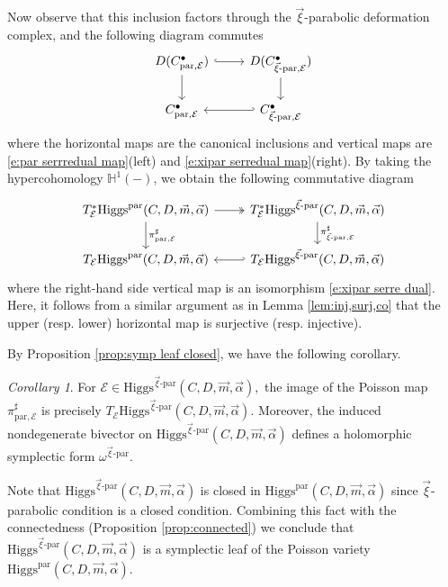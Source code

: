 \documentclass[11pt]{amsart}
\theoremstyle{plain}
\theoremstyle{definition}
\theoremstyle{remark}
\newtheorem{corollary}[theorem]{Corollary}
\newcommand{\Higgs}{\mathrm{Higgs}}
\def\a{\alpha}
\def\vxi{\vec{\xi}}
\def\vm{\vec{m}}
\def\va{\vec{\a}}
\begin{document}
Now observe that this inclusion factors through the $\vxi$-parabolic deformation complex, and the following diagram commutes
\[
\begin{tikzcd}
    D(C_{\text{par},\mathcal E}^\bullet) \arrow[r,hook] \arrow[d] & D(C_{\vxi\text{-par},\mathcal E}^\bullet) \arrow[d] \\
    C_{\text{par},\mathcal E}^\bullet& C_{\vxi\text{-par},\mathcal E}^\bullet \arrow[l, hook']
\end{tikzcd}
\]
where the horizontal maps are the canonical inclusions and vertical maps are \eqref{e:par serrredual map}(left) and \eqref{e:xipar serredual map}(right). By taking the hypercohomology $\mathbb{H}^1(-)$, we obtain the following commutative diagram 
\[
\begin{tikzcd}
T^*_\mathcal{E}\Higgs^{\text{par}}(C,D,\vm,\va) \arrow[r,two heads] \arrow[d, "\pi^\sharp_{\text{par},\mathcal E}"] & T^*_\mathcal{E}\Higgs^{\vxi\text{-par}}(C,D,\vm,\va) \arrow[d, "\pi^\sharp_{\vxi\text{-par},\mathcal{E}}"] \\
T_\mathcal{E}\Higgs^{\text{par}}(C,D,\vm,\va) & T_\mathcal{E}\Higgs^{\vxi\text{-par}}(C,D,\vm,\va) \arrow[l, hook']
\end{tikzcd}
\]
where the right-hand side vertical map is an isomorphism \eqref{e:xipar serre dual}. Here, it follows from a similar argument as in Lemma \ref{lem:inj,surj,co} that the upper (resp. lower) horizontal map is surjective (resp. injective).

By Proposition \ref{prop:symp leaf closed}, we have the following corollary. 


\begin{corollary}
    For $\mathcal{E}\in \Higgs^{\vxi\text{-par}}(C,D,\vm,\va),$ the image of the Poisson map $\pi^{\sharp}_{\text{par}, \mathcal{E}}$ is precisely  $T_{\mathcal{E}}\Higgs^{\vxi\text{-par}}(C,D,\vm,\va)$. Moreover, the induced nondegenerate bivector on $\Higgs^{\vxi\text{-par}}(C,D,\vm,\va)$ defines a holomorphic symplectic form $\omega^{\vxi\text{-par}}$. 
\end{corollary}

Note that $\Higgs^{\vxi\text{-par}}(C,D,\vm,\va)$ is closed in $\Higgs^{\text{par}}(C,D,\vm,\va)$ since $\vxi$-parabolic condition is a closed condition. Combining this fact with the connectedness (Proposition \ref{prop:connected}) we conclude that $\Higgs^{\vxi\text{-par}}(C,D,\vm,\va)$ is a symplectic leaf of the Poisson variety $\Higgs^{\text{par}}(C,D,\vm,\va)$. 
\end{document}
